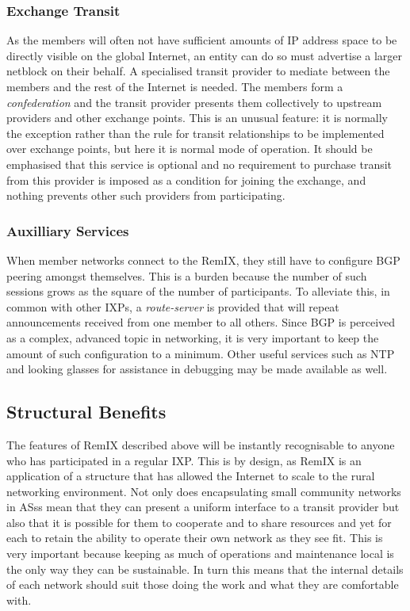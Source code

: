 \subsubsection{Exchange Transit}
As the members will often not have sufficient amounts of IP address
space to be directly visible on the global Internet, an entity 
can do so must advertise a larger netblock on their behalf. A
specialised transit provider to mediate between the members and the
rest of the Internet is needed. The members form a
\emph{confederation} and the transit provider presents them
collectively to upstream providers and other exchange points. This is
an unusual feature: it is normally the exception rather than the rule
for transit relationships to be implemented over exchange points, but
here it is normal mode of operation. It should be emphasised that this
service is optional and no requirement to purchase transit from this
provider is imposed as a condition for joining the exchange, and
nothing prevents other such providers from participating.

\subsubsection{Auxilliary Services}
When member networks connect to the RemIX, they still have to
configure \ac{BGP} peering amongst themselves. This is a burden
because the number of such sessions grows as the square of the number
of participants. To alleviate this, in common with other \acp{IXP}, a
\emph{route-server} is provided that will repeat announcements
received from one member to all others. Since \ac{BGP} is perceived as
a complex, advanced topic in networking, it is very important to keep
the amount of such configuration to a minimum. Other useful services
such as \ac{NTP} and looking glasses for assistance in debugging may
be made available as well.

\subsection{Structural Benefits}

The features of RemIX described above will be instantly recognisable
to anyone who has participated in a regular \ac{IXP}. This is by
design, as RemIX is an application of a structure that has allowed the
Internet to scale to the rural networking environment. Not only does
encapsulating small community networks in \acp{AS}s mean that they can
present a uniform interface to a transit provider but also that it is
possible for them to cooperate and to share resources and yet for each
to retain the ability to operate their own network as they see
fit. This is very important because keeping as much of operations and
maintenance local is the only way they can be sustainable. In turn
this means that the internal details of each network should suit those
doing the work and what they are comfortable with.

